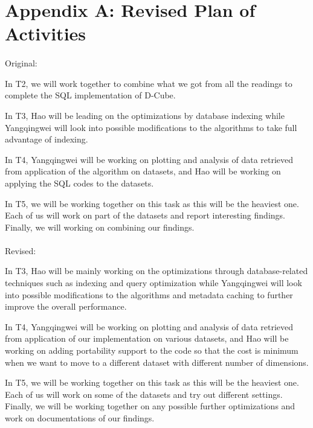\section*{Appendix A: Revised Plan of Activities}
\paragraph{} Original:

\bit
\item In T2, we will work together to combine what we got from all the readings to complete the SQL implementation of D-Cube.
\item 
In T3, Hao will be leading on the optimizations by database indexing while Yangqingwei will look into possible modifications to the algorithms to take full advantage of indexing.

\item In T4, Yangqingwei will be working on plotting and analysis of data retrieved from application of the algorithm on datasets, and Hao will be working on applying the SQL codes to the datasets.

\item
In T5, we will be working together on this task as this will be the heaviest one. Each of us will work on part of the datasets and report interesting findings. Finally, we will working on combining our findings.
\eit


\paragraph{} Revised:
\bit
    \item In T3, Hao will be mainly working on the optimizations through database-related techniques such as indexing and query optimization while Yangqingwei will look into possible modifications to the algorithms and metadata caching to further improve the overall performance.
    \item In T4, Yangqingwei will be working on plotting and analysis of data retrieved from application of our implementation on various datasets, and Hao will be working on adding portability support to the code so that the cost is minimum when we want to move to a different dataset with different number of dimensions.
    \item In T5, we will be working together on this task as this will be the heaviest one. Each of us will work on some of the datasets and try out different settings. Finally, we will be working together on any possible further optimizations and work on documentations of our findings.
\eit


